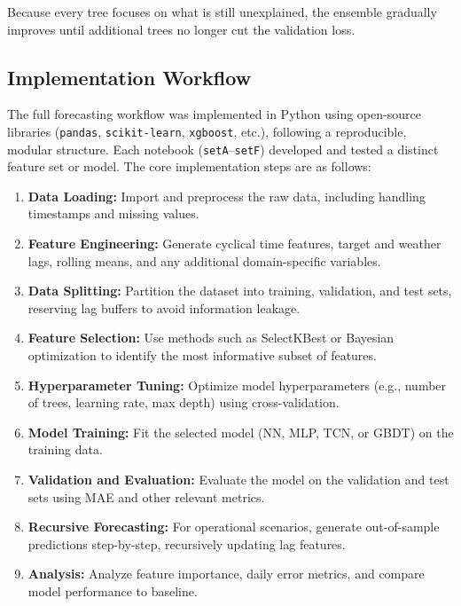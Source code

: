 Because every tree focuses on what is still unexplained, the ensemble
gradually improves until additional trees no longer cut the validation loss.



\subsection{Implementation Workflow}
\label{subsec:implementation}

The full forecasting workflow was implemented in Python using open-source libraries 
(\texttt{pandas}, \texttt{scikit-learn}, \texttt{xgboost}, etc.), following a 
reproducible, modular structure. Each notebook (\texttt{setA}–\texttt{setF}) 
developed and tested a distinct feature set or model. The core implementation steps 
are as follows:

\begin{enumerate}
    \item \textbf{Data Loading:} Import and preprocess the raw data, including handling timestamps and missing values.
    \item \textbf{Feature Engineering:} Generate cyclical time features, target and weather lags, rolling means, and any additional domain-specific variables.
    \item \textbf{Data Splitting:} Partition the dataset into training, validation, and test sets, reserving lag buffers to avoid information leakage.
    \item \textbf{Feature Selection:} Use methods such as SelectKBest or Bayesian optimization to identify the most informative subset of features.
    \item \textbf{Hyperparameter Tuning:} Optimize model hyperparameters (e.g., number of trees, learning rate, max depth) using cross-validation.
    \item \textbf{Model Training:} Fit the selected model (NN, MLP, TCN, or GBDT) on the training data.
    \item \textbf{Validation and Evaluation:} Evaluate the model on the validation and test sets using MAE and other relevant metrics.
    \item \textbf{Recursive Forecasting:} For operational scenarios, generate out-of-sample predictions step-by-step, recursively updating lag features.
    \item \textbf{Analysis:} Analyze feature importance, daily error metrics, and compare model performance to baseline.
\end{enumerate}

